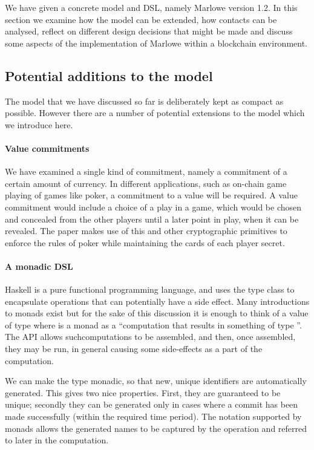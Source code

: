 \documentclass[
      acmsmall
    , screen
    , review=true
  ]{acmart}
\begin{document}
We have given a concrete model and DSL, namely Marlowe version 1.2. In this section we examine how the model can be 
extended, how contacts can be analysed, reflect on different design decisions that might be made and discuss some 
aspects of the implementation of Marlowe within a blockchain environment.

\subsection{Potential additions to the model}

The model that we have discussed so far is deliberately kept as compact as possible. However there are a number of potential extensions to the model which we introduce here. 

\paragraph{Value commitments}

We have examined a single kind of commitment, namely a commitment of a certain amount of currency. In different 
applications, such as on-chain game playing of games like poker, a commitment to a value will be required. A value 
commitment would include a choice of a play in a game, which would be chosen and concealed from the other players until 
a later point in play, when it can be revealed. The paper \cite{kumaresan2015use} makes use of this and other 
cryptographic primitives to enforce the rules of poker while maintaining the cards of each player secret.

\paragraph{A monadic DSL}

Haskell is a pure functional programming language, and uses the  type class to encapsulate
operations that can potentially have a side effect. Many introductions to monads exist  but for the 
sake of this discussion it is enough to think of a value of type  where  is a monad 
as a ``computation that results in something of type ''. The  API allows 
suchcomputations to be assembled, and then, once assembled, they may be run, in general causing some side-effects as a 
part of the computation.

We can make the  type monadic, so that new, unique identifiers are automatically generated. This gives two nice properties. First, they are guaranteed to be unique; secondly they can be generated only in cases where a commit has been made successfully (within the required time period). The 
 notation supported by monads allows the generated names to be captured by the  operation and referred to later in the computation.
\end{document}
